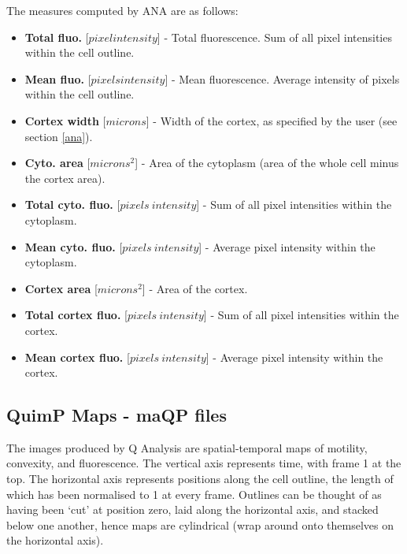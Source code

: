 \documentclass[a4paper,12pt]{article}
\begin{document}
The measures computed by ANA are as follows:

\begin{itemize}

	\item \textbf{Total fluo.} [$pixel intensity$] - Total fluorescence. Sum of all pixel intensities within the cell outline. 

	\item \textbf{Mean fluo.} [$pixels intensity$] -  Mean fluorescence. Average intensity of pixels within the cell outline.

	\item \textbf{Cortex width} [$microns$] - Width of the cortex, as specified by the user (see section \ref{ana}).
	
	\item \textbf{Cyto. area} [$microns^{2}$] - Area of the cytoplasm (area of the whole cell minus the cortex area).
	
	\item \textbf{Total cyto. fluo.} [$pixels~intensity$] - Sum of all pixel intensities within the cytoplasm. 
	
	\item \textbf{Mean cyto. fluo.} [$pixels~intensity$] - Average pixel intensity within the cytoplasm.
	
	\item \textbf{Cortex area} [$microns^{2}$] - Area of the cortex.
	
	\item \textbf{Total cortex fluo.} [$pixels~intensity$] - Sum of all pixel intensities within the cortex. 
	
	\item \textbf{Mean cortex fluo.} [$pixels~intensity$] - Average pixel intensity within the cortex.
	
\end{itemize}


\subsection{QuimP Maps - maQP files}
\label{maps}

The images produced by Q Analysis are spatial-temporal maps of motility, convexity, and fluorescence.  The vertical axis represents 
time, with frame 1 at the top.  The horizontal axis represents positions along the cell outline, the length of which
has been normalised to 1 at every frame.  Outlines can be
thought of as having been `cut' at position zero, laid along the horizontal axis, and stacked below one another, hence maps
are cylindrical (wrap around onto themselves on the horizontal axis). 
\end{document}
